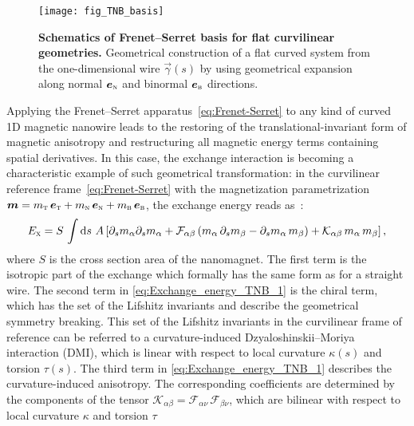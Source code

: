 \begin{figure}[t]
	\centering
	\texttt{[image: fig\_TNB\_basis]}
	\caption{\label{fig:TNB}%
		\textbf{Schematics of Frenet--Serret basis for flat curvilinear geometries.} Geometrical construction of a flat curved system from the one-dimensional wire $\vec{\gamma}(s)$ by using geometrical expansion along normal $\vec{e}_\textsc{n}$ and binormal $\vec{e}_\textsc{b}$ directions. 
	}
\end{figure}

Applying the Frenet--Serret apparatus~\eqref{eq:Frenet-Serret} to any kind of curved 1D magnetic nanowire leads to the restoring of the translational-invariant form of magnetic anisotropy and restructuring all magnetic energy terms containing spatial derivatives. In this case, the exchange interaction is becoming a characteristic example of such geometrical transformation: in the curvilinear reference frame~\eqref{eq:Frenet-Serret} with the magnetization parametrization $\vec{m} = m_\textsc{t}\,\vec{e}_\textsc{t} + m_\textsc{n}\,\vec{e}_\textsc{n} + m_\textsc{b}\,\vec{e}_\textsc{b}$, the exchange energy reads as~\cite{Sheka15}:
\begin{equation} \label{eq:Exchange_energy_TNB_1}
E_{\textsc{x}} = S \, \int \textrm{d} s  \, \, A \left[\partial_s m_\alpha \partial_sm_\alpha + \mathcal{F}_{\alpha \beta} \, ( m_{\alpha} \, \partial_s m_{\beta} - \partial_s m_{\alpha} \, m_{\beta} ) + \mathcal{K}_{\alpha \beta} \, m_{\alpha} \, m_{\beta} \right],
\end{equation}
where $S$ is the cross section area of the nanomagnet. The first term is the isotropic part of the exchange which formally  has the same form as for a straight wire. The second term in \eqref{eq:Exchange_energy_TNB_1} is the chiral term, which has the set of the Lifshitz invariants and describe the geometrical symmetry breaking. This set of the Lifshitz invariants in the curvilinear frame of reference can be referred to a curvature-induced Dzyaloshinskii--Moriya interaction (DMI), which is linear with respect to local curvature $\kappa(s)$ and torsion $\tau(s)$. The third term in \eqref{eq:Exchange_energy_TNB_1} describes the curvature-induced anisotropy. The corresponding coefficients are determined by the components of the tensor $\mathcal{K}_{\alpha \beta}= \mathcal{F}_{\alpha \nu} \, \mathcal{F}_{\beta \nu}$, which are bilinear with respect to local curvature $\kappa$ and torsion $\tau$
